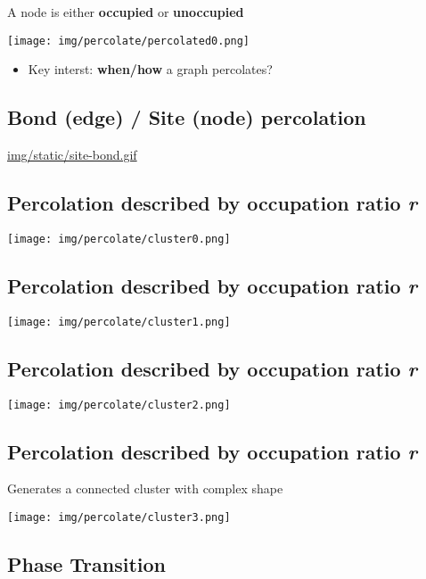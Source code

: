A node is either \textbf{occupied} or \textbf{unoccupied}

\texttt{[image: img/percolate/percolated0.png]}

\begin{alignright}
\begin{larger}
\begin{itemize}
\item Key interst: \textbf{when/how} a graph percolates?
\end{itemize}
\end{larger}
\end{alignright}

\subsection{Bond (edge) / Site (node) percolation}
\label{sec-15-2}

\url{img/static/site-bond.gif}

\subsection{Percolation described by occupation ratio \emph{r}}
\label{sec-15-3}

\texttt{[image: img/percolate/cluster0.png]}

\subsection{Percolation described by occupation ratio \emph{r}}
\label{sec-15-4}

\texttt{[image: img/percolate/cluster1.png]}

\subsection{Percolation described by occupation ratio \emph{r}}
\label{sec-15-5}

\texttt{[image: img/percolate/cluster2.png]}

\subsection{Percolation described by occupation ratio \emph{r}}
\label{sec-15-6}

Generates a connected cluster with complex shape

\texttt{[image: img/percolate/cluster3.png]}

\subsection{Phase Transition}
\label{sec-15-7}


